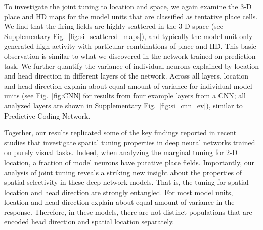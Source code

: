 \documentclass[11pt]{article}
\begin{document}

To investigate the joint tuning to location and space, we again examine the 3-D place and HD maps for the model units that are classified as tentative place cells. We find that the firing fields are highly scattered in the 3-D space (see Supplementary Fig.~\ref{fig:si_scattered_maps}), and typically
the model unit only generated high activity with particular combinations of place and HD. This basic observation is similar to what we discovered in the network trained on prediction task. We further quantify the variance of individual neurons explained by location and head direction in different layers of the network. Across all layers, location and head direction explain about equal amount of variance for individual model units (see Fig.~\ref{fig:CNN} for results from four example layers from a CNN; all analyzed layers are shown in Supplementary Fig.~\ref{fig:si_cnn_ev}), similar to Predictive Coding Network. 


Together, our results replicated some of the key findings reported in recent studies that investigate spatial tuning properties in deep neural networks trained on purely visual tasks. Indeed, when analyzing the marginal tuning for 2-D location, a fraction of model neurons have putative place fields. Importantly, our analysis of joint tuning reveals a striking new insight about the properties of spatial selectivity in these deep network models. That is, the tuning for spatial location and head direction are strongly entangled. For most model units, location and head direction explain about equal amount of variance in the response. Therefore, in these models, there are not distinct populations that are encoded head direction and spatial location separately. 



\end{document}
